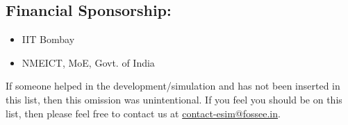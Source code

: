 \subsection*{Financial Sponsorship:}
\begin{multicols}{2}
\begin{itemize}
    \item IIT Bombay
    \item NMEICT, MoE, Govt. of India
    
\end{itemize}
\end{multicols}

If someone helped in the development/simulation and has not been inserted in this list, then this omission was unintentional. If you feel you should be on this list, then please feel free to contact us at \href{mailto:contact-esim@fossee.in}{contact-esim@fossee.in}. %

